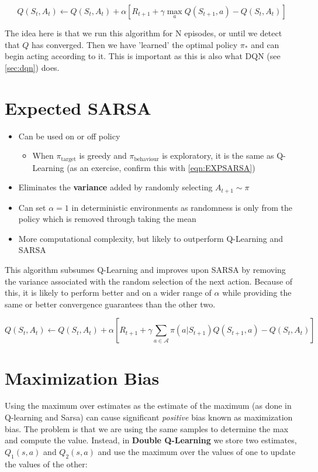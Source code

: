 \documentclass[11pt]{report}
\begin{document}
\begin{equation}
	\label{eqn:Q-Learning}
	Q(S_t, A_t) \xleftarrow{} Q(S_t, A_t) + \alpha \left[ R_{t+1} + \gamma\max_{a}Q(S_{t+1},a) - Q(S_t, A_t) \right]
\end{equation}


The idea here is that we run this algorithm for N episodes, or until we detect that $Q$ has converged. Then we have 'learned' the optimal policy $\pi_\ast$ and can begin acting according to it. This is important as this is also what DQN (see \autoref{sec:dqn}) does.

\section{Expected SARSA}\label{par:EXPSARSA}
\begin{itemize}
	\item Can be used on or off policy
	\begin{itemize}
		\item When $\pi_{\text{target}}$ is greedy and $\pi_{\text{behaviour}}$ is exploratory, it is the same as Q-Learning (as an exercise, confirm this with \autoref{eqn:EXPSARSA})
	\end{itemize}
	\item Eliminates the \textbf{variance} added by randomly selecting $A_{t+1} \sim \pi$
	\item Can set $\alpha=1$ in deterministic environments as randomness is only from the policy which is removed through taking the mean
	\item More computational complexity, but likely to outperform Q-Learning and SARSA
\end{itemize}

This algorithm subsumes Q-Learning and improves upon SARSA by removing the variance associated with the random selection of the next action. Because of this, it is likely to perform better and on a wider range of $\alpha$ while providing the same or better convergence guarantees than the other two.

\begin{equation}
	\label{eqn:EXPSARSA}
	Q(S_t, A_t) \xleftarrow{} Q(S_t, A_t) + \alpha \left[ R_{t+1} + \gamma \sum_{a \in \mathcal{A}}\pi(a|S_{t+1})Q(S_{t+1},a) - Q(S_t, A_t) \right]
\end{equation}

\section{Maximization Bias}\label{sec:double-q-learning}
Using the maximum over estimates as the estimate of the maximum (as done in Q-learning and Sarsa) can cause significant \textit{positive} bias known as maximization bias. The problem is that we are using the same samples to determine the max and compute the value. Instead, in \textbf{Double Q-Learning} we store two estimates, $Q_1(s,a)$ and $Q_2(s,a)$ and use the maximum over the values of one to update the values of the other:
\end{document}

